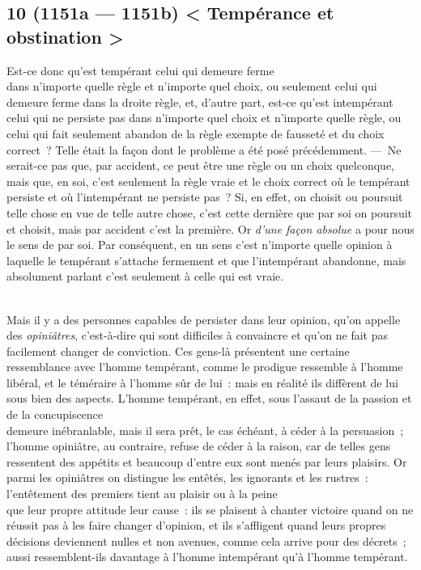 \documentclass[french,twoside]{book} %
\begin{document}
\subsection[{10 (1151a — 1151b) < Tempérance et obstination >}]{10 (1151a — 1151b) < Tempérance et obstination >}
\noindent Est-ce donc qu’est tempérant celui qui demeure ferme \\
dans n’importe quelle règle et n’importe quel choix, ou seulement celui qui demeure ferme dans la droite règle, et, d’autre part, est-ce qu’est intempérant celui qui ne persiste pas dans n’importe quel choix et n’importe quelle règle, ou celui qui fait seulement abandon de la règle exempte de fausseté et du choix correct ? Telle était la façon dont le problème a été posé précédemment. — Ne serait-ce pas que, par accident, ce peut être une règle ou un choix quelconque, mais que, en soi, c’est seulement la règle vraie et le choix correct où le tempérant \\
persiste et où l’intempérant ne persiste pas ? Si, en effet, on  choisit ou poursuit telle chose en vue de telle autre chose, c’est cette dernière que par soi on poursuit et choisit, mais par accident c’est la première. Or {\itshape d’une façon absolue} a pour nous le sens de par soi. Par conséquent, en un sens c’est n’importe quelle opinion à laquelle le tempérant s’attache fermement et que l’intempérant abandonne, mais absolument parlant c’est seulement à celle qui est vraie.\par
\\
Mais il y a des personnes capables de persister dans leur opinion, qu’on appelle des {\itshape opiniâtres}, c’est-à-dire qui sont difficiles à convaincre et qu’on ne fait pas facilement changer de conviction. Ces gens-là présentent une certaine ressemblance avec l’homme tempérant, comme le prodigue ressemble à l’homme libéral, et le téméraire à l’homme sûr de lui : mais en réalité ils diffèrent de lui sous bien des aspects. L’homme tempérant, en effet, sous l’assaut de la passion et de la concupiscence \\
demeure inébranlable, mais il sera prêt, le cas échéant, à céder à la persuasion ; l’homme opiniâtre, au contraire, refuse de céder à la raison, car de telles gens ressentent des appétits et beaucoup d’entre eux sont menés par leurs plaisirs. Or parmi les opiniâtres on distingue les entêtés, les ignorants et les rustres : l’entêtement des premiers tient au plaisir ou à la peine \\
que leur propre attitude leur cause : ils se plaisent à chanter victoire quand on ne réussit pas à les faire changer d’opinion, et ils s’affligent quand leurs propres décisions deviennent nulles et non avenues, comme cela arrive pour des décrets ; aussi ressemblent-ils davantage à l’homme intempérant qu’à l’homme tempérant.\par
\end{document}
